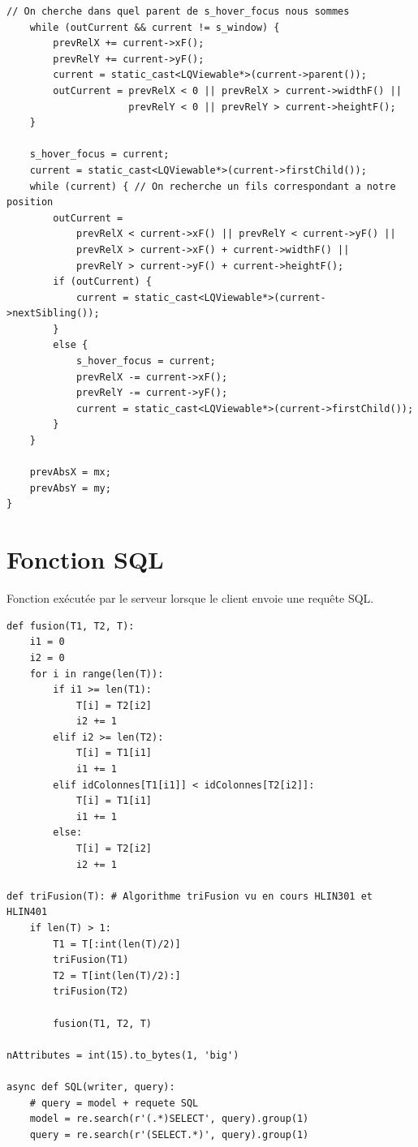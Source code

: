 \documentclass[twoside]{report}
\begin{document}
\begin{appendix}
\begin{lstlisting}[style=cpp, caption=LQAppController::cursor\_position\_callback, label=cpc]
    // On cherche dans quel parent de s_hover_focus nous sommes
    while (outCurrent && current != s_window) {
        prevRelX += current->xF();
        prevRelY += current->yF();
        current = static_cast<LQViewable*>(current->parent());
        outCurrent = prevRelX < 0 || prevRelX > current->widthF() ||
                     prevRelY < 0 || prevRelY > current->heightF();
    }

    s_hover_focus = current;
    current = static_cast<LQViewable*>(current->firstChild());
    while (current) { // On recherche un fils correspondant a notre position
        outCurrent =
            prevRelX < current->xF() || prevRelY < current->yF() ||
            prevRelX > current->xF() + current->widthF() ||
            prevRelY > current->yF() + current->heightF();
        if (outCurrent) {
            current = static_cast<LQViewable*>(current->nextSibling());
        }
        else {
            s_hover_focus = current;
            prevRelX -= current->xF();
            prevRelY -= current->yF();
            current = static_cast<LQViewable*>(current->firstChild());
        }
    }

    prevAbsX = mx;
    prevAbsY = my;
}
\end{lstlisting}

\section{Fonction SQL}
Fonction exécutée par le serveur lorsque le client envoie une requête SQL.

\begin{lstlisting}[style=py, caption=serveur.py : SQL, label=sql]
def fusion(T1, T2, T):
    i1 = 0
    i2 = 0
    for i in range(len(T)):
        if i1 >= len(T1):
            T[i] = T2[i2]
            i2 += 1
        elif i2 >= len(T2):
            T[i] = T1[i1]
            i1 += 1
        elif idColonnes[T1[i1]] < idColonnes[T2[i2]]:
            T[i] = T1[i1]
            i1 += 1
        else:
            T[i] = T2[i2]
            i2 += 1

def triFusion(T): # Algorithme triFusion vu en cours HLIN301 et HLIN401
    if len(T) > 1:
        T1 = T[:int(len(T)/2)]
        triFusion(T1)
        T2 = T[int(len(T)/2):]
        triFusion(T2)
        
        fusion(T1, T2, T)

nAttributes = int(15).to_bytes(1, 'big')

async def SQL(writer, query):
    # query = model + requete SQL
    model = re.search(r'(.*)SELECT', query).group(1)
    query = re.search(r'(SELECT.*)', query).group(1)


\end{lstlisting}
\end{appendix}
\end{document}
